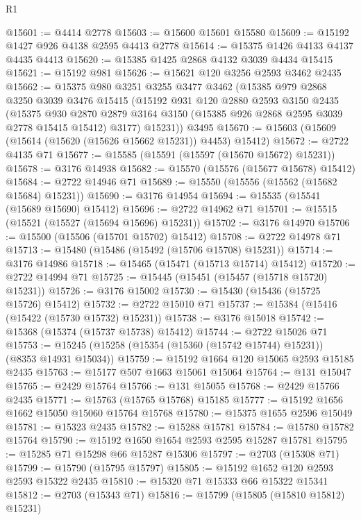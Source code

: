 \begin{lexlean}{R1}
\begin{coremodule}
@15601 := @4414 @2778
@15603 := @15600 @15601 @15580
@15609 := @15192 @1427 @926 @4138 @2595 @4413 @2778
@15614 := @15375 @1426 @4133 @4137 @4435 @4413
@15620 := @15385 @1425 @2868 @4132 @3039 @4434 @15415
@15621 := @15192 @981
@15626 := @15621 @120 @3256 @2593 @3462 @2435
@15662 := @15375
    @980
    @3251
    @3255
    @3477
    @3462
    (@15385
      @979
      @2868
      @3250
      @3039
      @3476
      @15415
      (@15192
        @931
        @120
        @2880
        @2593
        @3150
        @2435
        (@15375
          @930
          @2870
          @2879
          @3164
          @3150
          (@15385 @926 @2868 @2595 @3039 @2778 @15415 @15412)
          @3177)
        @15231))
    @3495
@15670 := @15603 (@15609 (@15614 (@15620 (@15626 @15662 @15231)) @4453) @15412)
@15672 := @2722 @4135 @71
@15677 := @15585 (@15591 (@15597 (@15670 @15672) @15231))
@15678 := @3176 @14938
@15682 := @15570 (@15576 (@15677 @15678) @15412)
@15684 := @2722 @14946 @71
@15689 := @15550 (@15556 (@15562 (@15682 @15684) @15231))
@15690 := @3176 @14954
@15694 := @15535 (@15541 (@15689 @15690) @15412)
@15696 := @2722 @14962 @71
@15701 := @15515 (@15521 (@15527 (@15694 @15696) @15231))
@15702 := @3176 @14970
@15706 := @15500 (@15506 (@15701 @15702) @15412)
@15708 := @2722 @14978 @71
@15713 := @15480 (@15486 (@15492 (@15706 @15708) @15231))
@15714 := @3176 @14986
@15718 := @15465 (@15471 (@15713 @15714) @15412)
@15720 := @2722 @14994 @71
@15725 := @15445 (@15451 (@15457 (@15718 @15720) @15231))
@15726 := @3176 @15002
@15730 := @15430 (@15436 (@15725 @15726) @15412)
@15732 := @2722 @15010 @71
@15737 := @15384 (@15416 (@15422 (@15730 @15732) @15231))
@15738 := @3176 @15018
@15742 := @15368 (@15374 (@15737 @15738) @15412)
@15744 := @2722 @15026 @71
@15753 := @15245 (@15258 (@15354 (@15360 (@15742 @15744) @15231)) (@8353 @14931 @15034))
@15759 := @15192 @1664 @120 @15065 @2593 @15185 @2435
@15763 := @15177 @507 @1663 @15061 @15064
@15764 := @131 @15047
@15765 := @2429 @15764
@15766 := @131 @15055
@15768 := @2429 @15766 @2435
@15771 := @15763 (@15765 @15768) @15185
@15777 := @15192 @1656 @1662 @15050 @15060 @15764 @15768
@15780 := @15375 @1655 @2596 @15049
@15781 := @15323 @2435
@15782 := @15288 @15781
@15784 := @15780 @15782 @15764
@15790 := @15192 @1650 @1654 @2593 @2595 @15287 @15781
@15795 := @15285 @71 @15298 @66 @15287 @15306
@15797 := @2703 (@15308 @71)
@15799 := @15790 (@15795 @15797)
@15805 := @15192 @1652 @120 @2593 @2593 @15322 @2435
@15810 := @15320 @71 @15333 @66 @15322 @15341
@15812 := @2703 (@15343 @71)
@15816 := @15799 (@15805 (@15810 @15812) @15231)

\end{coremodule}
\end{lexlean}
